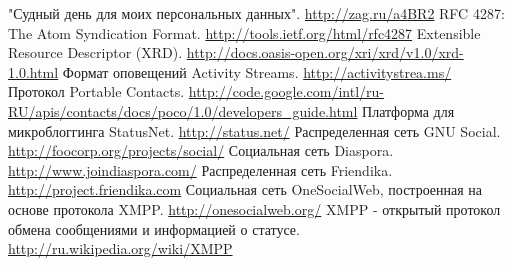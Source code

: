 \documentclass[10pt, a5paper]{article}
\begin{document}
\begin{thebibliography}{99}
	 "Судный день для моих персональных данных". \url{http://zag.ru/a4BR2}
	 RFC 4287: The Atom Syndication Format. \url{http://tools.ietf.org/html/rfc4287}
	 Extensible Resource Descriptor (XRD). \url{http://docs.oasis-open.org/xri/xrd/v1.0/xrd-1.0.html}
	 Формат оповещений Activity Streams. \url{http://activitystrea.ms/}
	 Протокол Portable Contacts. \url{http://code.google.com/intl/ru-RU/apis/contacts/docs/poco/1.0/developers_guide.html}
	 Платформа для микроблоггинга StatusNet. \url{http://status.net/}
	 Распределенная сеть GNU Social. \url{http://foocorp.org/projects/social/}
	 Социальная сеть Diaspora. \url{http://www.joindiaspora.com/}
	 Распределенная сеть Friendika. \url{http://project.friendika.com}
	 Социальная сеть OneSocialWeb, построенная на основе протокола XMPP. \url{http://onesocialweb.org/}
	 XMPP - открытый протокол обмена сообщениями и информацией о статусе. \url{http://ru.wikipedia.org/wiki/XMPP}
\end{thebibliography}
\end{document}
